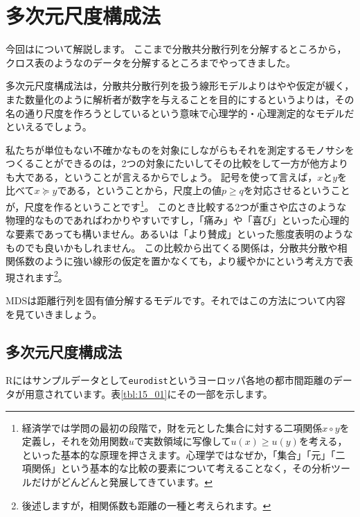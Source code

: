 \documentclass{ltjsbook}
\begin{document}
\chapter{多次元尺度構成法}
\label{x15_MDS}
今回はについて解説します。
ここまで分散共分散行列を分解するところから，クロス表のようなのデータを分解するところまでやってきました。

多次元尺度構成法は，分散共分散行列を扱う線形モデルよりはやや仮定が緩く，また数量化のように解析者が数字を与えることを目的にするというよりは，その名の通り尺度を作ろうとしているという意味で心理学的・心理測定的なモデルだといえるでしょう。

私たちが単位もない不確かなものを対象にしながらもそれを測定するモノサシをつくることができるのは，2つの対象にたいしてその比較をして一方が他方よりも大である，ということが言えるからでしょう。
記号を使って言えば，$x$と$y$を比べて$x \succeq y$である，ということから，尺度上の値$p \ge q$を対応させるということが，尺度を作るということです\footnote{経済学では学問の最初の段階で，財を元とした集合に対する二項関係$x \circ y$を定義し，それを効用関数$u$で実数領域に写像して$u(x) \ge u(y)$を考える，といった基本的な原理を押さえます。心理学ではなぜか，「集合」「元」「二項関係」という基本的な比較の要素について考えることなく，その分析ツールだけがどんどんと発展してきています。}。
このとき比較する2つが重さや広さのような物理的なものであればわかりやすいですし，「痛み」や「喜び」といった心理的な要素であっても構いません。あるいは「より賛成」といった態度表明のようなものでも良いかもしれません。
この比較から出てくる関係は，分散共分散や相関係数のように強い線形の仮定を置かなくても，より緩やかにという考え方で表現されます\footnote{後述しますが，相関係数も距離の一種と考えられます。}。

MDSは距離行列を固有値分解するモデルです。それではこの方法について内容を見ていきましょう。

\section{多次元尺度構成法}
Rにはサンプルデータとして\texttt{eurodist}というヨーロッパ各地の都市間距離のデータが用意されています。表\ref{tbl:15_01}にその一部を示します。
\end{document}
